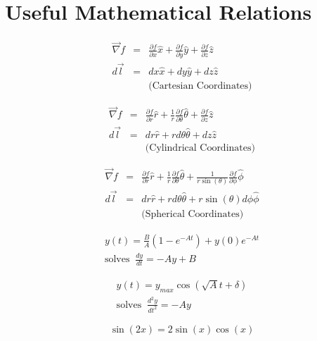 \documentclass[12pt]{book}
\begin{document}
\chapter{Useful Mathematical Relations}

\begin{multicols}{2}

\begin{eqnarray*}
 \vec{\nabla}f & = & \frac{\partial f}{\partial x} \hat{x} +\frac{\partial f}{\partial y} \hat{y} + \frac{\partial f}{\partial z} \hat{z} \\
 d\vec{l} & = & dx \hat{x} + dy \hat{y} + dz \hat{z} \\
 && \textrm{(Cartesian Coordinates)}
\end{eqnarray*}

\begin{eqnarray*}
 \vec{\nabla}f & = & \frac{\partial f}{\partial r} \hat{r} +\frac{1}{r}\frac{\partial f}{\partial \theta} \hat{\theta} + \frac{\partial f}{\partial z} \hat{z} \\
 d\vec{l} & = & dr \hat{r} + r d\theta \hat{\theta} + dz \hat{z} \\
 && \textrm{(Cylindrical Coordinates)}
\end{eqnarray*}

\begin{eqnarray*}
 \vec{\nabla}f & = & \frac{\partial f}{\partial r} \hat{r} +\frac{1}{r}\frac{\partial f}{\partial \theta} \hat{\theta} +\frac{1}{r\sin(\theta)} \frac{\partial f}{\partial \phi} \hat{\phi} \\
 d\vec{l} & = & dr \hat{r} + r d\theta \hat{\theta} + r\sin(\theta)d\phi\hat{\phi} \\
  && \textrm{(Spherical Coordinates)}
\end{eqnarray*}

\begin{eqnarray*}
 y(t) = \frac{B}{A} (1-e^{-At}) + y(0) e^{-At} \\ \mathrm{solves} \; \; \frac{dy}{dt} = -Ay+B
\end{eqnarray*}

\begin{eqnarray*}
 y(t) = y_{max} \cos(\sqrt{A}t+\delta) \\ \mathrm{solves} \; \; \frac{d^2 y}{dt^2} = -Ay
\end{eqnarray*}

\columnbreak

\begin{equation*}
 \sin(2x) = 2\sin(x)\cos(x)
\end{equation*}


\end{multicols}
\end{document}
